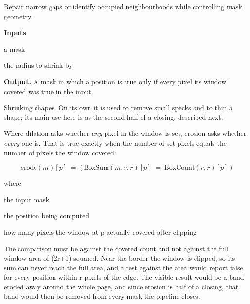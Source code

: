 Repair narrow gaps or identify occupied neighbourhoods while controlling mask geometry.




\noindent\textbf{Inputs}
\begin{description}[leftmargin=2.2em,style=nextline,font=\normalfont\ttfamily]\setlength\itemsep{1pt}
  \item[{m}] \normalfont a mask
  \item[{r}] \normalfont the radius to shrink by
\end{description}

\noindent\textbf{Output.} A mask in which a position is true only if every pixel its window covered was true in the input.


Shrinking shapes. On its own it is used to remove small specks and to thin a shape; its main use here is as the second half of a closing, described next.


Where dilation asks whether \emph{any} pixel in the window is set, erosion asks whether \emph{every} one is. That is true exactly when the number of set pixels equals the number of pixels the window covered:


\begin{equation}
\mathrm{erode}(m)[p] \;=\; \big(\,\mathrm{BoxSum}(m,r,r)[p]\;=\;\mathrm{BoxCount}(r,r)[p]\,\big)
\end{equation}

\noindent where
\begin{description}[leftmargin=2.4em,style=nextline,font=\normalfont\ttfamily]\setlength\itemsep{1pt}
  \item[{$m$}] \normalfont the input mask
  \item[{$p$}] \normalfont the position being computed
  \item[{$\mathrm{BoxCount}(r,r)[p]$}] \normalfont how many pixels the window at p actually covered after clipping
\end{description}
The comparison must be against the covered count and not against the full window area of (2r+1) squared. Near the border the window is clipped, so its sum can never reach the full area, and a test against the area would report false for every position within r pixels of the edge. The visible result would be a band eroded away around the whole page, and since erosion is half of a closing, that band would then be removed from every mask the pipeline closes.



